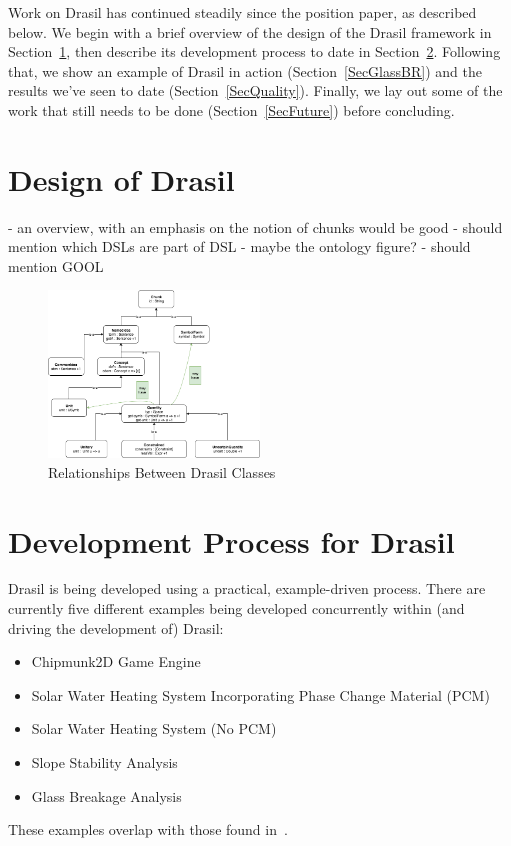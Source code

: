 \documentclass[sigconf]{acmart}
\begin{document}
Work on Drasil has continued steadily since the position paper, as described 
below. We begin with a brief overview of the design of the Drasil framework in 
Section~\ref{SecDesign}, then describe its development process to date in 
Section~\ref{SecDevProcess}. Following that, we show an example of Drasil in 
action (Section~\ref{SecGlassBR}) and the results we've seen to date 
(Section~\ref{SecQuality}). Finally, we lay out some of the work that still 
needs to be done (Section~\ref{SecFuture}) before concluding.

\section{Design of Drasil} \label{SecDesign}

- an overview, with an emphasis on the notion of chunks would be good - should
mention which DSLs are part of DSL - maybe the ontology figure?
- should mention GOOL

\begin{figure}[htpb]
\centering
\includegraphics[width=0.5\textwidth]{figures/class_hierarchy.png}
\caption{Relationships Between Drasil Classes}
\label{element}
\end{figure}

\section{Development Process for Drasil} \label{SecDevProcess}

Drasil is being developed using a practical, example-driven process. There are 
currently five different examples being developed concurrently within (and 
driving the development of) Drasil:

\begin{itemize}
\item Chipmunk2D Game Engine
\item Solar Water Heating System Incorporating Phase Change Material (PCM)
\item Solar Water Heating System (No PCM)
\item Slope Stability Analysis
\item Glass Breakage Analysis
\end{itemize}
These examples overlap with those found in~\cite{SmithJegatheesanAndKelly2016}.
\end{document}
